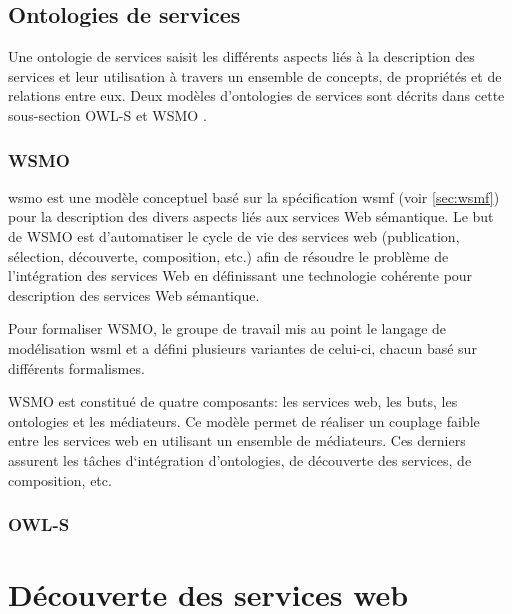   \subsection{Ontologies de services}
  \label{sec:ont-serices}

  Une ontologie de services saisit les différents aspects liés à la
  description des services et leur utilisation à travers un ensemble
  de concepts, de propriétés et de relations entre eux. Deux modèles
  d'ontologies de services sont décrits dans cette sous-section
  \textsc{OWL-S} et \textsc{WSMO} \cite{elie2010}.

    \subsubsection{WSMO}
    \label{sec:wsmo}

    \acrshort{wsmo} \cite{de2005web} est une modèle conceptuel basé
    sur la spécification \acrshort{wsmf} \cite{fensel2002web} (voir
    \ref{sec:wsmf}) pour la description des divers aspects liés aux
    services Web sémantique. Le but de \textsc{WSMO} est d'automatiser
    le cycle de vie des services web (publication, sélection,
    découverte, composition, etc.) afin de résoudre le problème de
    l'intégration des services Web en définissant une technologie
    cohérente pour description des services Web sémantique.

    Pour formaliser \textsc{WSMO}, le groupe de travail mis au point
    le langage de modélisation \acrshort{wsml} \cite{de2006web} et a
    défini plusieurs variantes de celui-ci, chacun basé sur différents
    formalismes.

    \textsc{WSMO} est constitué de quatre composants: les services
    web, les buts, les ontologies et les médiateurs. Ce modèle permet
    de réaliser un couplage faible entre les services web en utilisant
    un ensemble de médiateurs. Ces derniers assurent les tâches
    d‘intégration d'ontologies, de découverte des services, de
    composition, etc.

    \subsubsection{OWL-S}
    \label{sec:owl-s-1}
  \newpage

\section{Découverte des services web}

